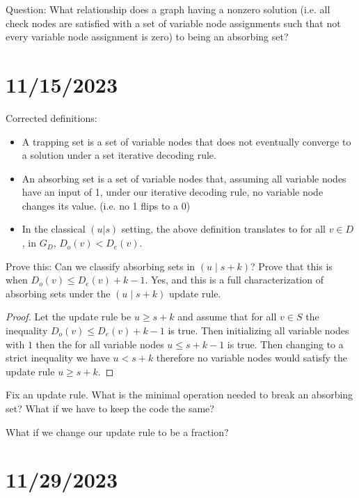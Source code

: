 \documentclass{article}
\begin{document}
Question: What relationship does a graph having a nonzero solution (i.e. all check nodes are satisfied with a set of variable node assignments such that not every variable node assignment is zero) to being an absorbing set?

\section*{11/15/2023}

Corrected definitions:
\begin{itemize}
    \item A trapping set is a set of variable nodes that does not eventually converge to a solution under a set iterative decoding rule.
    \item An absorbing set is a set of variable nodes that, assuming all variable nodes have an input of 1, under our iterative decoding rule, no variable node changes its value. (i.e. no 1 flips to a 0)
    \item In the classical $(u|s)$ setting, the above definition translates to for all $v \in D$, in $G_D$, $D_o(v) < D_e(v)$.
\end{itemize}

Prove this: Can we classify absorbing sets in $(u \mid s+k)$? Prove that this is when $D_o(v) \leq D_e(v) + k-1$. Yes, and this is a full characterization of absorbing sets under the $(u \mid s+k)$ update rule.

\begin{proof}
    Let the update rule be   $u\geq s+k$ and assume that for all $v\in S$ the inequality $D_o(v)\leq D_e(v)+k-1$ is true. Then initializing all variable nodes with $1$ then the for all variable nodes $u\leq s+k-1$ is true. Then changing to a strict inequality we have $u< s+k$ therefore no variable nodes would satisfy the update rule $u\geq s+k$.
\end{proof}



Fix an update rule. What is the minimal operation needed to break an absorbing set? What if we have to keep the code the same?

What if we change our update rule to be a fraction?

\section*{11/29/2023}
\end{document}
